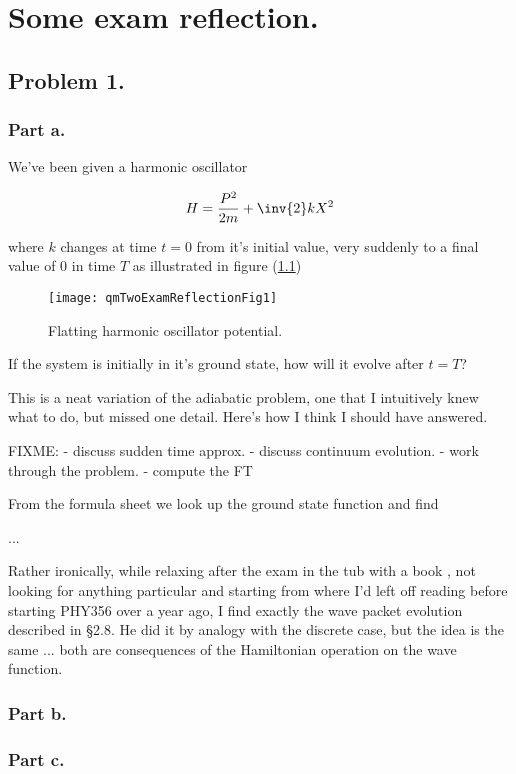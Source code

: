 
%

\chapter{Some exam reflection.}
\label{chap:qmTwoExamReflection}
{}
\date{Dec 13, 2011}

\beginArtWithToc

\section{Problem 1.}
\subsection{Part a.}

We've been given a harmonic oscillator

\begin{equation}\label{eqn:qmTwoExamReflection:n}
H = \frac{P^2}{2m} + \inv{2} k X^2
\end{equation}

where $k$ changes at time $t=0$ from it's initial value, very suddenly to a final value of $0$ in time $T$ as illustrated in figure (\ref{fig:qmTwoExamReflection:qmTwoExamReflectionFig1})
\begin{figure}[htp]
   \centering
   \texttt{[image: qmTwoExamReflectionFig1]}
   \caption{Flatting harmonic oscillator potential.}\label{fig:qmTwoExamReflection:qmTwoExamReflectionFig1}
\end{figure}

If the system is initially in it's ground state, how will it evolve after $t = T$?

This is a neat variation of the adiabatic problem, one that I intuitively knew what to do, but missed one detail.  Here's how I think I should have answered.

FIXME: 
- discuss sudden time approx.
- discuss continuum evolution.
- work through the problem.
- compute the FT

From the formula sheet we look up the ground state function and find

...

Rather ironically, while relaxing after the exam in the tub with a book \cite{pauli2000wm}, not looking for anything particular and starting from where I'd left off reading before starting PHY356 over a year ago, I find exactly the wave packet evolution described in \S 2.8.  He did it by analogy with the discrete case, but the idea is the same ... both are consequences of the Hamiltonian operation on the wave function.

\subsection{Part b.}

\subsection{Part c.}


\EndArticle
